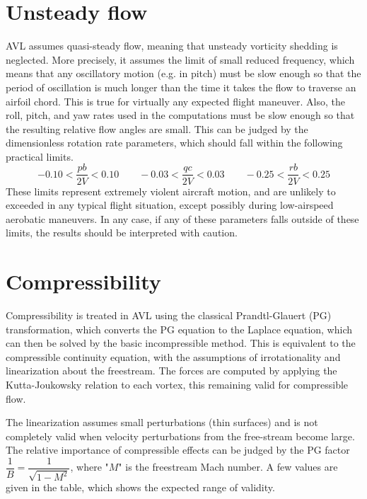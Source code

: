 \section{Unsteady flow}
AVL assumes quasi-steady flow, meaning that unsteady vorticity shedding
is neglected.  More precisely, it assumes the limit of small reduced frequency,
which means that any oscillatory motion (e.g. in pitch) must be slow enough 
so that the period of oscillation is much longer than the time it takes
the flow to traverse an airfoil chord.  This is true for virtually any
expected flight maneuver.  Also, the roll, pitch, and yaw rates used 
in the computations must be slow enough so that the resulting relative 
flow angles are small.  This can be judged by the dimensionless 
rotation rate parameters, which should fall within the following 
practical limits.
\[-0.10 < \frac{pb}{2V}< 0.10 \qquad -0.03 < \frac{qc}{2V}< 0.03 \qquad -0.25 < \frac{rb}{2V}< 0.25\]
These limits represent extremely violent aircraft motion, and are unlikely
to exceeded in any typical flight situation, except possibly during
low-airspeed aerobatic maneuvers.  In any case, if any of these 
parameters falls outside of these limits, the results should be 
interpreted with caution.

\section{Compressibility}
Compressibility is treated in AVL using the classical Prandtl-Glauert (PG) 
transformation, which converts the PG equation to the Laplace equation,
which can then be solved by the basic incompressible method.  This
is equivalent to the compressible continuity equation, with the assumptions 
of irrotationality and linearization about the freestream.  The forces
are computed by applying the Kutta-Joukowsky relation to each vortex,
this remaining valid for compressible flow.

The linearization assumes small perturbations (thin surfaces) and is not 
completely valid when velocity perturbations from the free-stream become 
large.  The relative importance of compressible effects can be judged by 
the PG factor  $\dfrac{1}{B} = \dfrac{1}{\sqrt{1 - M^2}}$, where "$M$" is the freestream Mach 
number.  A few values are given in the table, which shows the expected
range of validity. 


